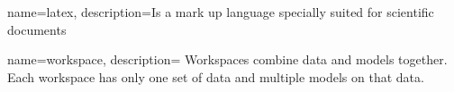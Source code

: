 {
    name=latex,
    description={Is a mark up language specially suited for scientific documents}
}

{
    name=workspace,
    description={%
        Workspaces combine data and models together. Each workspace has only one set of data and multiple models on that data.
    }
}